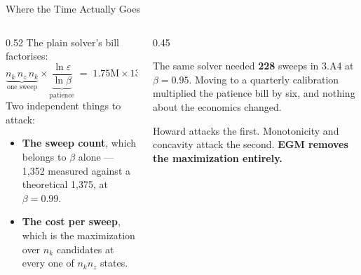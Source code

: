 \begin{frame}{Where the Time Actually Goes}
\begin{columns}[T]
\begin{column}{0.52\textwidth}
\small
The plain solver's bill factorises:
\[
  \underbrace{n_k\,n_z\,n_k}_{\text{one sweep}}\times\underbrace{\frac{\ln\varepsilon}{\ln\beta}}_{\text{patience}}
  \;=\; 1.75\text{M}\times1352 \;=\; \mathbf{2.4\ \text{billion}} .
\]
Two independent things to attack:
\begin{itemize}\footnotesize
  \item \textbf{The sweep count}, which belongs to $\beta$ alone --- 1{,}352 measured against a theoretical 1{,}375, at $\beta=0.99$.
  \item \textbf{The cost per sweep}, which is the maximization over $n_k$ candidates at every one of $n_k n_z$ states.
\end{itemize}
\end{column}
\begin{column}{0.45\textwidth}
\begin{cautionbox}[title=\textbf{This got worse since Session 3}]\small
The same solver needed \textbf{228} sweeps in 3.A4 at $\beta=0.95$. Moving to a quarterly calibration multiplied the patience bill by six, and nothing about the economics changed.
\end{cautionbox}
\medskip
\begin{conceptbox}\footnotesize
Howard attacks the first. Monotonicity and concavity attack the second. \textbf{EGM removes the maximization entirely.}
\end{conceptbox}
\end{column}
\end{columns}
\vspace{1mm}
\end{frame}

